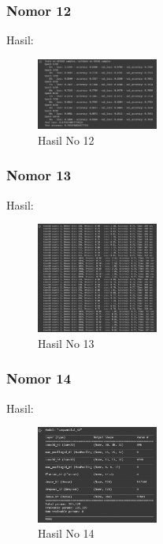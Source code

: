 \subsubsection{Nomor 12}
\hfill\break

Hasil:
\begin{figure}[H]
\centering
	\includegraphics[width=4cm]{figures/1174053/7/no12.jpg}
	\caption{Hasil No 12}
\end{figure}

\subsubsection{Nomor 13}
\hfill\break

Hasil:
\begin{figure}[H]
\centering
	\includegraphics[width=4cm]{figures/1174053/7/no13.jpg}
	\caption{Hasil No 13}
\end{figure}

\subsubsection{Nomor 14}
\hfill\break

Hasil:
\begin{figure}[H]
\centering
	\includegraphics[width=4cm]{figures/1174053/7/no14.jpg}
	\caption{Hasil No 14}
\end{figure}

